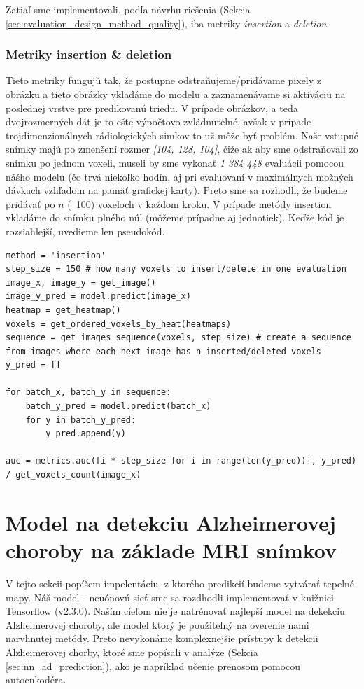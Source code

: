 Zatiaľ sme implementovali, podľa návrhu riešenia (Sekcia \ref{sec:evaluation_design_method_quality}), iba metriky \textit{insertion} a \textit{deletion}.

\subsubsection{Metriky insertion \& deletion}

Tieto metriky fungujú tak, že postupne odstraňujeme/pridávame pixely z obrázku a tieto obrázky vkladáme do modelu a zaznamenávame si aktiváciu na poslednej vrstve pre predikovanú triedu. V prípade obrázkov, a teda dvojrozmerných dát je to ešte výpočtovo zvládnutelné, avšak v prípade trojdimenzionálnych rádiologických simkov to už môže byť problém. Naše vstupné snímky majú po zmenšení rozmer \textit{[104, 128, 104]}, čiže ak aby sme odstraňovali zo snímku po jednom voxeli, museli by sme vykonať \textit{1 384 448} evaluácii pomocou nášho modelu (čo trvá niekoľko hodín, aj pri evaluovaní v maximálnych možných dávkach vzhľadom na pamäť grafickej karty). Preto sme sa rozhodli, že budeme pridávať po $n$ (~100) voxeloch v každom kroku. V prípade metódy insertion vkladáme do snímku plného núl (môžeme prípadne aj jednotiek). Keďže kód je rozsiahlejší, uvedieme len pseudokód.

\begin{lstlisting}
method = 'insertion'
step_size = 150 # how many voxels to insert/delete in one evaluation
image_x, image_y = get_image()
image_y_pred = model.predict(image_x)
heatmap = get_heatmap()
voxels = get_ordered_voxels_by_heat(heatmaps)
sequence = get_images_sequence(voxels, step_size) # create a sequence from images where each next image has n inserted/deleted voxels
y_pred = []

for batch_x, batch_y in sequence:
    batch_y_pred = model.predict(batch_x)
    for y in batch_y_pred:
        y_pred.append(y)

auc = metrics.auc([i * step_size for i in range(len(y_pred))], y_pred) / get_voxels_count(image_x)
\end{lstlisting}

\section{Model na detekciu Alzheimerovej choroby na základe MRI snímkov}

V tejto sekcii popíšem impelentáciu, z ktorého predikcií budeme vytvárať tepelné mapy. Náš model - neuónovú sieť sme sa rozdhodli implementovať v knižnici Tensorflow (v2.3.0). Naším cieľom nie je natrénovať najlepší model na dekekciu Alzheimerovej choroby, ale model ktorý je použiteľný na overenie nami narvhnutej metódy. Preto nevykonáme komplexnejšie prístupy k detekcii Alzheimerovej chorby, ktoré sme popísali v analýze (Sekcia \ref{sec:nn_ad_prediction}), ako je napríklad učenie prenosom pomocou autoenkodéra.

